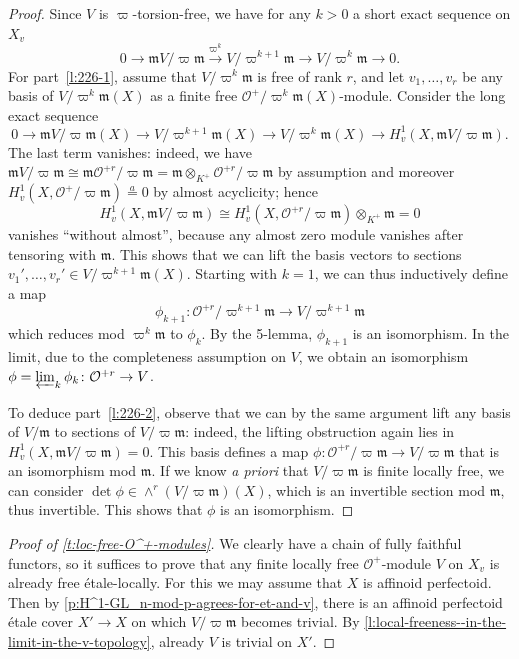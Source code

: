 \documentclass[10pt,a4paper]{article}
\theoremstyle{definition}
\theoremstyle{remark}
\newcommand{\lra}{\longrightarrow}
\renewcommand{\O}{\mathcal{O}}
\newcommand{\m}{\mathfrak{m}}
\newcommand{\aeq}{\stackrel{a}{=}}
\numberwithin{equation}{section}
\begin{document}
\begin{proof}
	Since $V$ is $\varpi$-torsion-free, we have for any $k>0$ a short exact sequence on $X_v$
	\[ 0\lra \m V/\varpi\mathfrak m\xrightarrow{\varpi^k} V/\varpi^{k+1}\mathfrak m\lra V/\varpi^k\m\lra 0.\]
	For part~\eqref{l:226-1}, assume that $V/\varpi^k\m$ is free of rank $r$, and let $v_1,\dots,v_r$ be any basis of $V/\varpi^k\m(X)$ as a finite free $\O^{+}/\varpi^k\m(X)$-module. Consider the long exact sequence
	\[ 0\lra \m V/\varpi \m(X)\lra V/\varpi^{k+1}\m(X)\lra V/\varpi^k\m(X)\lra H^1_v(X,\m V/\varpi\m).\]
	The last term vanishes: indeed, we have $\m V/\varpi\m\cong \m \O^{+r}/\varpi\m= \m \otimes_{K^+}\O^{+r}/\varpi\m$ by assumption and moreover $H^1_v(X,\O^+/\varpi\m)\aeq 0$ by almost acyclicity; hence
	\[ H^1_v(X,\m V/\varpi\m)\cong H^1_v(X,\O^{+r}/\varpi\m)\otimes_{K^+} \m=0\]
	vanishes ``without almost'', because any almost zero module vanishes after tensoring with $\mathfrak m$.
	This shows that we can lift the basis vectors to sections  $v_1',\dots,v_r'\in V/\varpi^{k+1}\m(X)$. Starting with $k=1$, we can thus inductively define  a map
	\[ \phi_{k+1}\colon \O^{+r}/\varpi^{k+1}\m\lra V/\varpi^{k+1}\m\]
	which reduces mod $\varpi^k\m$ to $\phi_k$. By the 5-lemma, $\phi_{k+1}$ is an isomorphism. In the limit, due to the completeness assumption on $V$, we obtain an isomorphism
	$\phi=\varprojlim_k\phi_k\colon \O^{+r}\to V$.
	
	To deduce part~\eqref{l:226-2}, observe that we can by the same argument lift any basis of $V/\m$ to sections of $V/\varpi \m$: indeed, the lifting obstruction again lies in $H^1_v(X,\m V/\varpi\m)=0$. This basis defines a map $\phi\colon \O^{+r}/\varpi\m\to V/\varpi\m$ that is an isomorphism mod $\m$. If we know \textit{a priori} that $V/\varpi\m$ is finite locally free, we can consider $\det \phi\in \wedge^r(V/\varpi\m)(X)$, which is an invertible  section mod $\m$, thus invertible. This shows that $\phi$ is an isomorphism.
\end{proof}

\begin{proof}[Proof of \cref{t:loc-free-O^+-modules}]
	We clearly have a chain of fully faithful functors, so it suffices to prove that any finite locally free $\O^+$-module $V$ on $X_{v}$ is already free \'etale-locally. For this we may assume that $X$ is affinoid perfectoid. Then by \cref{p:H^1-GL_n-mod-p-agrees-for-et-and-v}, there is an affinoid perfectoid \'etale cover $X'\to X$ on which $V/\varpi\m$ becomes trivial. By \cref{l:local-freeness--in-the-limit-in-the-v-topology}, already $V$ is trivial on $X'$.
\end{proof}
\end{document}
